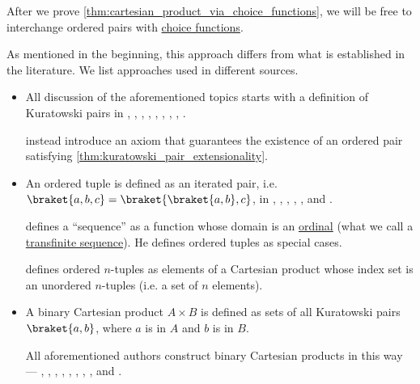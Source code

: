 \begin{remark}
\begin{itemize}
    After we prove \cref{thm:cartesian_product_via_choice_functions}, we will be free to interchange ordered pairs with \hyperref[def:choice_function]{choice functions}.
  \end{itemize}

  As mentioned in the beginning, this approach differs from what is established in the literature. We list approaches used in different sources.
  \begin{itemize}
    \item All discussion of the aforementioned topics starts with a definition of Kuratowski pairs in
    \cite[def. I.4.11]{Kunen2013SetTheory},
    \cite[7]{Jech2006SetTheory},
    \cite[def. 6.2.1]{Hinman2005Logic},
    \cite[235]{Mendelson2015Logic},
    \cite[36]{Enderton1977SetTheory},
    \cite[23]{Halmos1960NaiveSetTheory},
    \cite[139]{КолмогоровДрагалин2006ЛогикаДополнительныеГлавы},
    \cite[182]{Герасимов2014Вычислимость},
    \cite[\S 1.2.3]{КусраевКутателадзе2005БулевозначныйАнализ}.

    \Textcite[72]{Bourbaki2004TheoryOfSets} instead introduce an axiom that guarantees the existence of an ordered pair satisfying \cref{thm:kuratowski_pair_extensionality}.

    \item An ordered tuple is defined as an iterated pair, i.e. \( \braket{ a, b, c } = \braket{ \braket{ a, b }, c } \), in
    \cite[7]{Jech2006SetTheory},
    \cite[def. 6.2.1]{Hinman2005Logic},
    \cite[236]{Mendelson2015Logic},
    \cite[31]{Enderton1977SetTheory},
    \cite[139]{КолмогоровДрагалин2006ЛогикаДополнительныеГлавы},
    \cite[183]{Герасимов2014Вычислимость} and
    \cite[16]{КусраевКутателадзе2005БулевозначныйАнализ}.

    \Textcite[22]{Kunen2013SetTheory} defines a \enquote{sequence} as a function whose domain is an \hyperref[def:ordinal]{ordinal} (what we call a \hyperref[def:transfinite_sequence]{transfinite sequence}). He defines ordered tuples as special cases.

    \Textcite[36]{Halmos1960NaiveSetTheory} defines ordered \( n \)-tuples as elements of a Cartesian product whose index set is an unordered \( n \)-tuples (i.e. a set of \( n \) elements).

    \item A binary Cartesian product \( A \times B \) is defined as sets of all Kuratowski pairs \( \braket{ a, b } \), where \( a \) is in \( A \) and \( b \) is in \( B \).

    All aforementioned authors construct binary Cartesian products in this way ---
    \cite[def. I.6.5]{Kunen2013SetTheory},
    \cite[10]{Jech2006SetTheory},
    \cite[def. 6.2.3]{Hinman2005Logic},
    \cite[240]{Mendelson2015Logic},
    \cite[37]{Enderton1977SetTheory},
    \cite[24]{Halmos1960NaiveSetTheory},
    \cite[def. I.5.1]{Bourbaki2004TheoryOfSets},
    \cite[141]{КолмогоровДрагалин2006ЛогикаДополнительныеГлавы},
    \cite[188]{Герасимов2014Вычислимость} and
    \cite[\S 1.2.3]{КусраевКутателадзе2005БулевозначныйАнализ}.


\end{itemize}
\end{remark}

